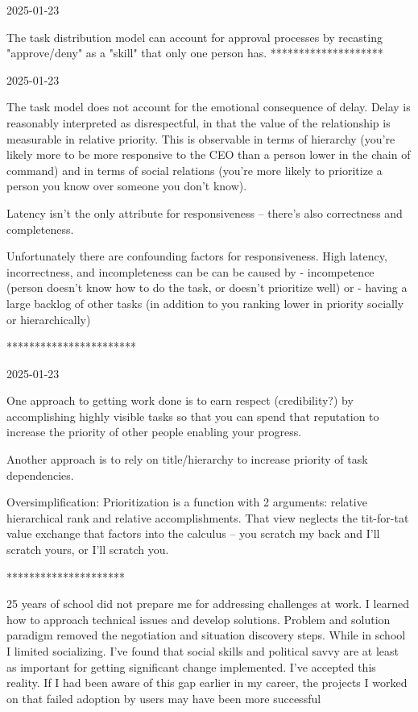 

2025-01-23

The task distribution model can account for approval processes by recasting "approve/deny" as a "skill" that only one person has. 
********************

2025-01-23

The task model does not account for the emotional consequence of delay. Delay is reasonably interpreted as disrespectful, in that the value of the relationship is measurable in relative priority. This is observable in terms of hierarchy (you're likely more to be more responsive to the CEO than a person lower in the chain of command) and in terms of social relations (you're more likely to prioritize a person you know over someone you don't know). 

Latency isn't the only attribute for responsiveness -- there's also correctness and completeness.

Unfortunately there are confounding factors for responsiveness. High latency, incorrectness, and incompleteness can be can be caused by 
- incompetence (person doesn't know how to do the task, or doesn't prioritize well)
or
- having a large backlog of other tasks (in addition to you ranking lower in priority socially or hierarchically)

***********************

2025-01-23

One approach to getting work done is to earn respect (credibility?) by accomplishing highly visible tasks so that you can spend that reputation to increase the priority of other people enabling your progress. 

Another approach is to rely on title/hierarchy to increase priority of task dependencies. 

Oversimplification: Prioritization is a function with 2 arguments: relative hierarchical rank and relative accomplishments.
That view neglects the tit-for-tat value exchange that factors into the calculus -- you scratch my back and I'll scratch yours, or I'll scratch you.

*********************

25 years of school did not prepare me for addressing challenges at work. I learned how to approach technical issues and develop solutions. Problem and solution paradigm removed the negotiation and situation discovery steps. While in school I limited socializing. I've found that social skills and political savvy are at least as important for getting significant change implemented.  I've accepted this reality. If I had been aware of this gap earlier in my career, the projects I worked on that failed adoption by users may have been more successful 

